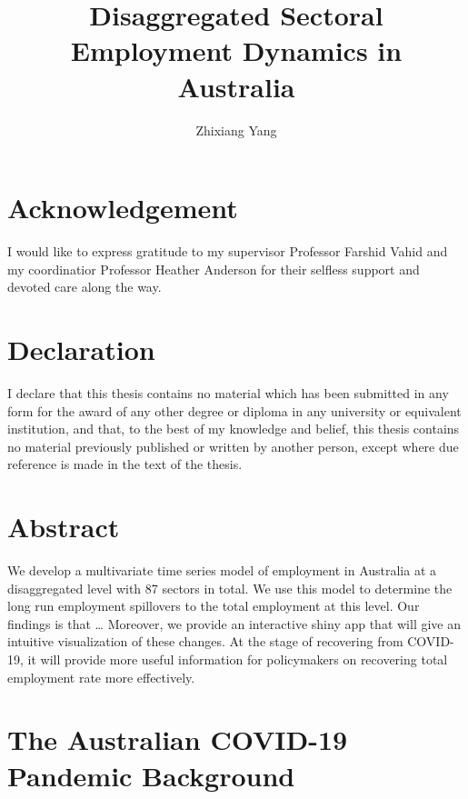 \documentclass{monashthesis}
\author{Zhixiang Yang}
\title{Disaggregated Sectoral Employment Dynamics in Australia}
\begin{document}

\titlepage

{\sf\tighttoc\doublespacing}

\clearpage{}\setcounter{page}{0}

\hypertarget{acknowledgement}{%
\chapter*{Acknowledgement}\label{acknowledgement}}

I would like to express gratitude to my supervisor Professor Farshid Vahid and my coordinatior Professor Heather Anderson for their selfless support and devoted care along the way.

\hypertarget{declaration}{%
\chapter*{Declaration}\label{declaration}}

I declare that this thesis contains no material which has been submitted in any form for the award of any other degree or diploma in any university or equivalent institution, and that, to the best of my knowledge and belief, this thesis contains no material previously published or written by another person, except where due reference is made in the text of the thesis.

\hypertarget{abstract}{%
\chapter*{Abstract}\label{abstract}}

We develop a multivariate time series model of employment in Australia at a disaggregated level with 87 sectors in total. We use this model to determine the long run employment spillovers to the total employment at this level. Our findings is that \ldots{} Moreover, we provide an interactive shiny app that will give an intuitive visualization of these changes. At the stage of recovering from COVID-19, it will provide more useful information for policymakers on recovering total employment rate more effectively.

\hypertarget{the-australian-covid-19-pandemic-background}{%
\chapter{The Australian COVID-19 Pandemic Background}\label{the-australian-covid-19-pandemic-background}}
\end{document}
